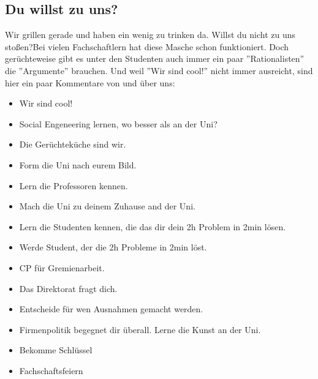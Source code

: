\documentclass[12pt,a4paper]{article}
\begin{document}
	\subsection{Du willst zu uns?}
		\glqq Wir grillen gerade und haben ein wenig zu trinken da. Willst du nicht zu uns stoßen?\grqq { }Bei vielen Fachschaftlern hat diese Masche schon funktioniert. Doch gerüchteweise gibt es unter den Studenten auch immer ein paar ''Rationalisten'' die ''Argumente'' brauchen. Und weil ''Wir sind cool!'' nicht immer ausreicht, sind hier ein paar Kommentare von und über uns:
		\begin{itemize}
			\item Wir sind cool!
			\item Social Engeneering lernen, wo besser als an der Uni?
			\item Die Gerüchteküche sind wir.
			\item Form die Uni nach eurem Bild.
			\item Lern die Professoren kennen.
			\item Mach die Uni zu deinem Zuhause and der Uni.
			\item Lern die Studenten kennen, die das dir dein 2h Problem in 2min lösen.
			\item Werde Student, der die 2h Probleme in 2min löst.
			\item CP für Gremienarbeit.
			\item Das Direktorat fragt dich.
			\item Entscheide für wen Ausnahmen gemacht werden.
			\item Firmenpolitik begegnet dir überall. Lerne die Kunst an der Uni.
			\item Bekomme Schlüssel
			\item Fachschaftsfeiern
		\end{itemize}

	
	
\end{document}
